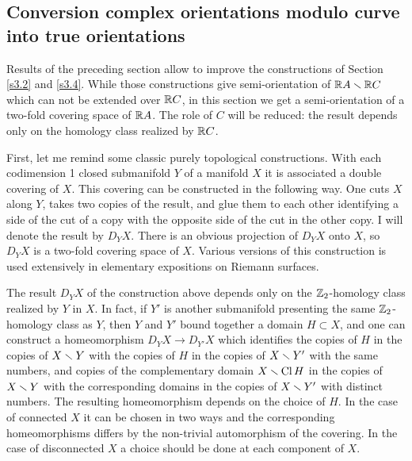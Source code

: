 \documentclass{article}
\numberwithin{equation}{section}
\begin{document}
\subsection{Conversion complex orientations modulo curve into true
orientations }\label{s3.7}  
Results of the preceding section allow to improve
the constructions of Section \ref{s3.2} and \ref{s3.4}.  
While those constructions
give semi-orientation of $\mathbb R A\smallsetminus\mathbb R C$ which can not be
extended over $\mathbb R C$, in this section we get a semi-orientation of a
two-fold covering space of $\mathbb R A$. The role of $C$ will be reduced: the
result depends only on the homology class realized by $\mathbb R C$.

First, let me remind some classic purely topological constructions.
With each codimension 1 closed submanifold $Y$ of a manifold $X$ it is
associated a double covering of $X$. This covering can be constructed
in the following way.  One cuts $X$ along $Y$, takes two copies of the
result, and glue them to each other identifying a side of the cut of a
copy with the opposite side of the cut in the other copy. I will denote
the result by $D_YX$.  There is an obvious projection of $D_YX$ onto
$X$, so $D_YX$ is a two-fold covering space of $X$. Various versions of
this construction is used extensively in elementary expositions on
Riemann surfaces.

The result $D_YX$ of the construction above depends only on the
$\mathbb Z_2$-homology class realized by $Y$ in $X$. In fact, if $Y'$ is
another submanifold presenting the same $\mathbb Z_2$-homology class as $Y$,
then $Y$ and $Y'$ bound together a domain $H\subset X$, and one can
construct a homeomorphism $D_YX\to D_{Y'}X$ which identifies the copies
of $H$ in the copies of $X\smallsetminus Y$ with the copies of $H$ in the
copies of $X\smallsetminus Y'$ with the same numbers, and copies of the
complementary domain  $X\smallsetminus \operatorname{Cl} H$ in the copies of $X\smallsetminus Y$
with the corresponding domains in the copies of $X\smallsetminus Y'$ with
distinct numbers.  The  resulting  homeomorphism  depends  on  the
choice of
$H$. In the case of connected $X$ it can be chosen in two ways and the
corresponding homeomorphisms differs by the non-trivial automorphism of
the covering. In the case of disconnected $X$ a choice should be
done at each component of $X$.
\end{document}
